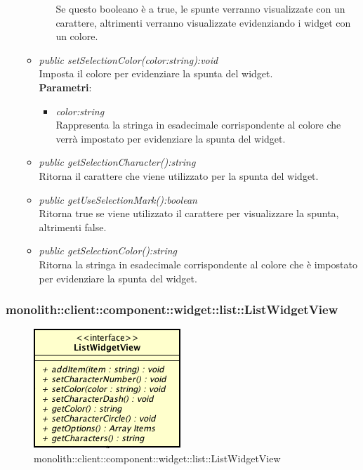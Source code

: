 \begin{itemize}
\begin{itemize}
\begin{itemize}
		Se questo booleano è a true, le spunte verranno visualizzate con un carattere, altrimenti verranno visualizzate evidenziando i widget con un colore.
		\end{itemize} 
	\item \textit{public setSelectionColor(color:string):void}\\
	Imposta il colore per evidenziare la spunta del widget.
		\\ \textbf{Parametri}: \begin{itemize}
		\item \textit{color:string}\\
		Rappresenta la stringa in esadecimale corrispondente al colore che verrà impostato per evidenziare la spunta del widget.
		\end{itemize} 
	\item \textit{public getSelectionCharacter():string}\\
	Ritorna il carattere che viene utilizzato per la spunta del widget.
	\item \textit{public getUseSelectionMark():boolean}\\
	Ritorna true se viene utilizzato il carattere per visualizzare la spunta, altrimenti false.
	\item \textit{public getSelectionColor():string}\\
	Ritorna la stringa in esadecimale corrispondente al colore che è impostato per evidenziare la spunta del widget.
	\end{itemize}
\end{itemize}

\subsubsection{monolith::client::component::widget::list::ListWidgetView}

\label{monolith::client::component::widget::list::ListWidgetView}
\begin{figure}[H]
	\centering
	\includegraphics[scale=0.5]{Sezioni/SottosezioniST/img/ListWidgetView.png}
	\caption{monolith::client::component::widget::list::ListWidgetView}
\end{figure}

